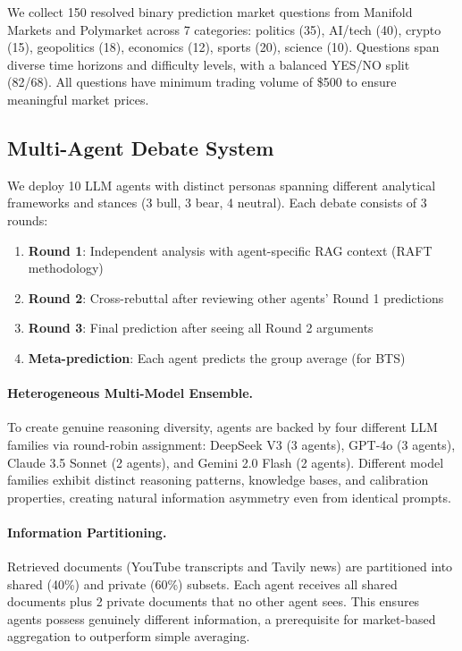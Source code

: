 \documentclass[conference]{IEEEtran}
\begin{document}
We collect 150 resolved binary prediction market questions from Manifold Markets and Polymarket across 7 categories: politics (35), AI/tech (40), crypto (15), geopolitics (18), economics (12), sports (20), science (10). Questions span diverse time horizons and difficulty levels, with a balanced YES/NO split (82/68). All questions have minimum trading volume of \$500 to ensure meaningful market prices.

\subsection{Multi-Agent Debate System}

We deploy 10 LLM agents with distinct personas spanning different analytical frameworks and stances (3 bull, 3 bear, 4 neutral). Each debate consists of 3 rounds:
\begin{enumerate}
    \item \textbf{Round 1}: Independent analysis with agent-specific RAG context (RAFT methodology)
    \item \textbf{Round 2}: Cross-rebuttal after reviewing other agents' Round 1 predictions
    \item \textbf{Round 3}: Final prediction after seeing all Round 2 arguments
    \item \textbf{Meta-prediction}: Each agent predicts the group average (for BTS)
\end{enumerate}

\paragraph{Heterogeneous Multi-Model Ensemble.}
To create genuine reasoning diversity, agents are backed by four different LLM families via round-robin assignment: DeepSeek V3 (3 agents), GPT-4o (3 agents), Claude 3.5 Sonnet (2 agents), and Gemini 2.0 Flash (2 agents). Different model families exhibit distinct reasoning patterns, knowledge bases, and calibration properties, creating natural information asymmetry even from identical prompts.

\paragraph{Information Partitioning.}
Retrieved documents (YouTube transcripts and Tavily news) are partitioned into shared (40\%) and private (60\%) subsets. Each agent receives all shared documents plus 2 private documents that no other agent sees. This ensures agents possess genuinely different information, a prerequisite for market-based aggregation to outperform simple averaging.
\end{document}
